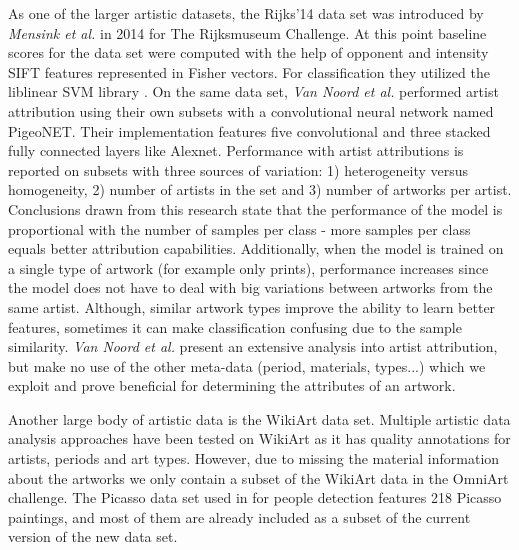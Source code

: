 \documentclass[sigconf]{acmart}
\begin{document}
As one of the larger artistic datasets, the Rijks'14 data set was introduced by \textit{Mensink et al.}\cite{mensink2014rijksmuseum} in 2014 for The Rijksmuseum Challenge. At this point baseline scores for the data set were computed with the help of opponent and intensity SIFT features \cite{van2010evaluating} represented in Fisher vectors. For classification they utilized the liblinear SVM library \cite{fan2008liblinear}. On the same data set, \textit{Van Noord et al.}\cite{van2015toward} performed artist attribution using their own subsets with a convolutional neural network named PigeoNET. Their implementation features five convolutional and three stacked fully connected layers like Alexnet. Performance with artist attributions is reported on subsets with three sources of variation: 1) heterogeneity versus homogeneity, 2) number of artists in the set and 3) number of artworks per artist. Conclusions drawn from this research state that the performance of the model is proportional with the number of samples per class - more samples per class equals better attribution capabilities. Additionally, when the model is trained on a single type of artwork (for example only prints), performance increases since the model does not have to deal with big variations between artworks from the same artist. Although, similar artwork types improve the ability to learn better features, sometimes it can make classification confusing due to the sample similarity. \textit{Van Noord et al.}\cite{van2015toward} present an extensive analysis into artist attribution, but make no use of the other meta-data (period, materials, types...) which we exploit and prove beneficial for determining the attributes of an artwork. 

Another large body of artistic data is the WikiArt data set. Multiple artistic data analysis approaches \cite{bar2014classification, elgammal2015quantifying, karayev2013recognizing, saleh2015large} have been tested on WikiArt as it has quality annotations for artists, periods and art types. However, due to missing the material information about the artworks we only contain a subset of the WikiArt data in the OmniArt challenge. The Picasso data set used in \cite{ginosar2014detecting, westlake2016detecting} for people detection features 218 Picasso paintings, and most of them are already included as a subset of the current version of the new data set.
\end{document}
